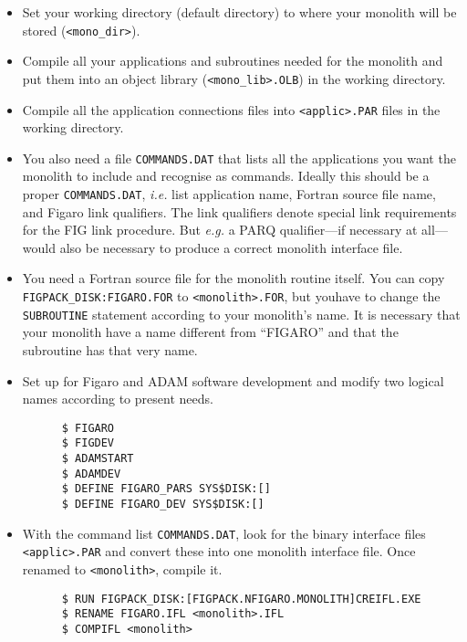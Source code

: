 \begin{itemize}

\item Set your working directory (default directory) to where your monolith
will be stored ({\tt <mono\_dir>}).

\item Compile all your applications and subroutines needed for the monolith and
put them into an object library ({\tt <mono\_lib>.OLB}) in the working
directory.

\item Compile all the application connections files into {\tt <applic>.PAR}
files in the working directory.

\item You also need a file {\tt COMMANDS.DAT} that lists all the applications
you want the monolith to include and recognise as commands. Ideally this should
be a proper {\tt COMMANDS.DAT}, {\em i.e.\/} list application name, Fortran
source file name, and Figaro link qualifiers. The link qualifiers denote
special link requirements for the FIG link procedure. But {\em e.g.\/} a PARQ
qualifier---if necessary at all---would also be necessary to produce a
correct monolith interface file.

\item You need a Fortran source file for the monolith routine itself. You can
copy {\tt FIGPACK\_\-DISK:\-FIGARO.FOR}
to {\tt <monolith>.FOR}, but you\linebreak have to change the {\tt SUBROUTINE}
statement according to your monolith's name. It is necessary that your monolith
have a name different from ``FIGARO'' and that the subroutine has that very
name.

\item Set up for Figaro and ADAM software development and modify two logical
names according to present needs.

\begin{verbatim}
      $ FIGARO
      $ FIGDEV
      $ ADAMSTART
      $ ADAMDEV
      $ DEFINE FIGARO_PARS SYS$DISK:[]
      $ DEFINE FIGARO_DEV SYS$DISK:[]
\end{verbatim}

\item With the command list {\tt COMMANDS.DAT}, look for the binary interface
files {\tt <applic>.PAR} and convert these into one monolith interface file.
Once renamed to {\tt <monolith>}, compile it.

\begin{verbatim}
      $ RUN FIGPACK_DISK:[FIGPACK.NFIGARO.MONOLITH]CREIFL.EXE
      $ RENAME FIGARO.IFL <monolith>.IFL
      $ COMPIFL <monolith>
\end{verbatim}


\end{itemize}
